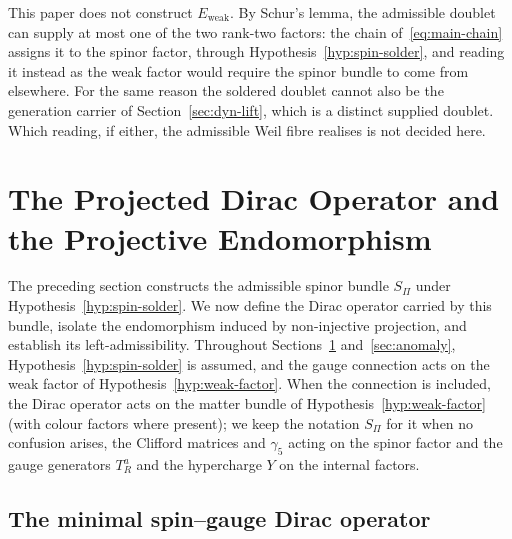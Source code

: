 \documentclass[11pt,a4paper]{article}
\theoremstyle{definition}
\theoremstyle{remark}
\begin{document}
    This paper does not construct $E_{\mathrm{weak}}$.
    By Schur's lemma, the admissible doublet can supply at most one of the two rank-two factors: the chain
    of~\eqref{eq:main-chain} assigns it to the spinor factor, through Hypothesis~\ref{hyp:spin-solder}, and
    reading it instead as the weak factor would require the spinor bundle to come from elsewhere.
    For the same reason the soldered doublet cannot also be the generation carrier of
    Section~\ref{sec:dyn-lift}, which is a distinct supplied doublet.
    Which reading, if either, the admissible Weil fibre realises is not decided here.

  \section{The Projected Dirac Operator and the Projective Endomorphism}
  \label{sec:dirac}

  The preceding section constructs the admissible spinor bundle $S_\Pi$ under
  Hypothesis~\ref{hyp:spin-solder}.
  We now define the Dirac operator carried by this bundle, isolate the endomorphism
  induced by non-injective projection, and establish its left-admissibility.
  Throughout Sections~\ref{sec:dirac} and~\ref{sec:anomaly}, Hypothesis~\ref{hyp:spin-solder} is
  assumed, and the gauge connection acts on the weak factor of Hypothesis~\ref{hyp:weak-factor}.
  When the connection is included, the Dirac operator acts on the matter bundle of
  Hypothesis~\ref{hyp:weak-factor} (with colour factors where present); we keep the
  notation $S_\Pi$ for it when no confusion arises, the Clifford matrices and $\gamma_5$ acting on the
  spinor factor and the gauge generators $T^a_R$ and the hypercharge $Y$ on the internal factors.

  \subsection{The minimal spin--gauge Dirac operator}
    \label{ssec:minimal-dirac}
\end{document}
